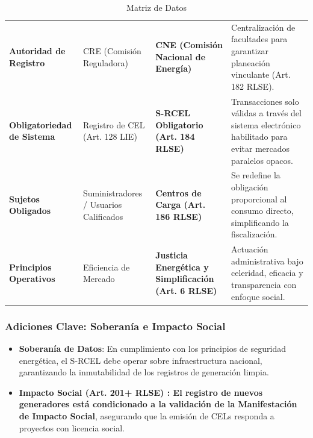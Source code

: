 \documentclass{cel}
\begin{document}
\vspace{0.3cm}
\begin{tabladoradoLargo}
\renewcommand{\tabularxcolumn}[1]{p{#1}}
\begin{xltabular}{\textwidth}{|X|X|X|X|}
\caption{Matriz de Datos} \\
\toprule
{}  &  &  &  \\
\midrule
\endhead
\textbf{Autoridad de Registro} & CRE (Comisión Reguladora) & \textbf{CNE (Comisión Nacional de Energía)} & Centralización de facultades para garantizar planeación vinculante (Art. 182 RLSE). \\ \hline
\textbf{Obligatoriedad de Sistema} & Registro de CEL (Art. 128 LIE) & \textbf{S-RCEL Obligatorio (Art. 184 RLSE)} & Transacciones solo válidas a través del sistema electrónico habilitado para evitar mercados paralelos opacos. \\ \hline
\textbf{Sujetos Obligados} & Suministradores / Usuarios Calificados & \textbf{Centros de Carga (Art. 186 RLSE)} & Se redefine la obligación proporcional al consumo directo, simplificando la fiscalización. \\ \hline
\textbf{Principios Operativos} & Eficiencia de Mercado & \textbf{Justicia Energética y Simplificación (Art. 6 RLSE)} & Actuación administrativa bajo celeridad, eficacia y transparencia con enfoque social. \\ \hline
\bottomrule
\end{xltabular}
\end{tabladoradoLargo}

\subsubsection{Adiciones Clave: Soberanía e Impacto Social}
\nopagebreak

\begin{itemize}
\item \textbf{Soberanía de Datos}: En cumplimiento con los principios de seguridad energética, el S-RCEL debe operar sobre infraestructura nacional, garantizando la inmutabilidad de los registros de generación limpia.
\item \textbf{Impacto Social (Art. 201+ RLSE) \textbf{: El registro de nuevos generadores está condicionado a la validación de la }Manifestación de Impacto Social}, asegurando que la emisión de CELs responda a proyectos con licencia social.


\end{itemize}
\end{document}
